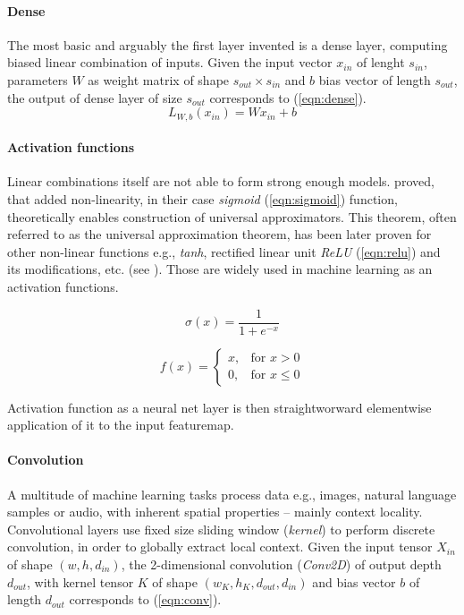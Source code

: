 \paragraph{Dense}
The most basic and arguably the first layer invented is a dense layer, computing biased linear combination of inputs. Given the input vector $x_{in}$ of lenght $s_{in}$, parameters $W$ as weight matrix of shape $s_{out} \times s_{in}$ and $b$ bias vector of length $s_{out}$, the output of dense layer of size $s_{out}$ corresponds to (\ref{eqn:dense}).
\begin{equation} \label{eqn:dense}
L_{W, b}(x_{in}) = W x_{in} + b
\end{equation}

\paragraph{Activation functions}
Linear combinations itself are not able to form strong enough models. \cite{Cybenko1989} proved, that added non-linearity, in their case \emph{sigmoid} (\ref{eqn:sigmoid}) function, theoretically enables construction of universal approximators. This theorem, often referred to as the universal approximation theorem, has been later proven for other non-linear functions e.g., \emph{tanh}, rectified linear unit \emph{ReLU} (\ref{eqn:relu}) and its modifications, etc. (see \cite{DBLP:journals/corr/SonodaM15}). Those are widely used in machine learning as an activation functions.

\begin{equation} \label{eqn:sigmoid}
\sigma(x) = \frac{1}{1 + e^{-x}}
\end{equation}

\begin{equation} \label{eqn:relu}
f(x) =
\begin{cases}
    x, & \text{for } x > 0 \\
    0, & \text{for } x \leq 0
\end{cases}
\end{equation}

Activation function as a neural net layer is then straightworward elementwise application of it to the input featuremap.

\paragraph{Convolution}
A multitude of machine learning tasks process data e.g., images, natural language samples or audio, with inherent spatial properties -- mainly context locality. Convolutional layers use fixed size sliding window (\emph{kernel}) to perform discrete convolution, in order to globally extract local context. Given the input tensor $X_{in}$ of shape $(w, h, d_{in})$, the 2-dimensional convolution (\emph{Conv2D}) of output depth $d_{out}$, with kernel tensor $K$ of shape $(w_K, h_K, d_{out}, d_{in})$ and bias vector $b$ of length $d_{out}$ corresponds to (\ref{eqn:conv}).


